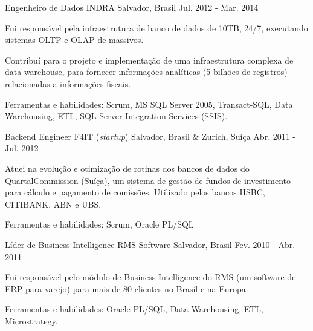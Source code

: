 \begin{cventries}

\cventry
{Engenheiro de Dados} %
{INDRA} %
{Salvador, Brasil} %
{Jul. 2012 - Mar. 2014} %
{ %
\begin{cvitems}
	\item{Fui responsável pela infraestrutura de banco de dados de 10TB, 24/7, executando sistemas OLTP e OLAP de massivos.}
	\item{Contribuí para o projeto e implementação de uma infraestrutura complexa de data warehouse, para fornecer informações analíticas (5 bilhões de registros) relacionadas a informações fiscais.}
	\item{Ferramentas e habilidades: Scrum, MS SQL Server 2005, Transact-SQL, Data Warehousing, ETL, SQL Server Integration Services (SSIS).}
\end{cvitems} 
}


\cventry
{Backend Engineer} %
{F4IT (\textit{startup})} %
{Salvador, Brasil \& Zurich, Suíça} %
{Abr. 2011 - Jul. 2012} %
{ %
\begin{cvitems}
	\item{Atuei na evolução e otimização de rotinas dos bancos de dados do QuartalCommission (Suíça), um sistema de gestão de fundos de investimento para cálculo e pagamento de comissões. Utilizado pelos bancos HSBC, CITIBANK, ABN e UBS.}
	\item{Ferramentas e habilidades: Scrum, Oracle PL/SQL}
\end{cvitems}
}


\cventry
{Líder de Business Intelligence} %
{RMS Software} %
{Salvador, Brasil} %
{Fev. 2010 - Abr. 2011} %
{ %
\begin{cvitems}
	\item{Fui responsável pelo módulo de Business Intelligence do RMS (um software de ERP para varejo) para mais de 80 clientes no Brasil e na Europa.}
	\item{Ferramentas e habilidades: Oracle PL/SQL, Data Warehousing, ETL, Microstrategy.}
\end{cvitems}
}



\end{cventries}

